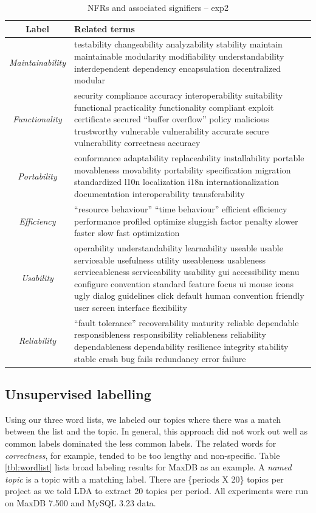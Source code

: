 \documentclass[]{sig-alternate}
\begin{document}
\begin{table}
	\centering
\begin{tabular}{c|p{9cm}}
\toprule
\textbf{Label} & \textbf{Related terms} \\
\midrule
\emph{Maintainability} &
testability changeability analyzability stability maintain maintainable modularity modifiability understandability interdependent dependency encapsulation decentralized modular\\ \hline
\emph{Functionality} &
security compliance accuracy interoperability suitability functional practicality functionality compliant exploit certificate secured ``buffer overflow'' policy malicious trustworthy vulnerable vulnerability accurate secure vulnerability correctness accuracy\\ \hline
\emph{Portability} &
conformance adaptability replaceability installability portable movableness movability portability specification migration standardized l10n localization i18n internationalization documentation interoperability transferability\\ \hline
\emph{Efficiency} &
``resource behaviour'' ``time behaviour'' efficient efficiency performance profiled optimize sluggish factor penalty slower faster slow fast optimization\\ \hline
\emph{Usability} &
operability understandability learnability useable usable serviceable usefulness utility useableness usableness serviceableness serviceability usability gui accessibility menu configure convention standard feature focus ui mouse icons ugly dialog guidelines click default human convention friendly user screen interface flexibility\\ \hline
\emph{Reliability} &
``fault tolerance'' recoverability maturity reliable dependable responsibleness responsibility reliableness reliability dependableness dependability resilience integrity stability stable crash bug fails redundancy error failure\\ 
\bottomrule
\end{tabular}
	\caption{NFRs and associated signifiers -- \textsf{exp2}}
	\label{tbl:wnsig}

\end{table}



\subsection{Unsupervised labelling}
Using our three word lists, we labeled our topics where there was a match between the list and the topic. In general, this approach did not work out well as common labels dominated the less common labels. The related words for \emph{correctness}, for example, tended to be too lengthy and non-specific. 
Table \ref{tbl:wordlist} lists broad labeling results for MaxDB as an example. A \emph{named topic} is a topic with a matching label. There are \{periods X 20\} topics per project as we told LDA to extract 20 topics per period. All experiments were run on MaxDB 7.500 and MySQL 3.23 data.
\end{document}
